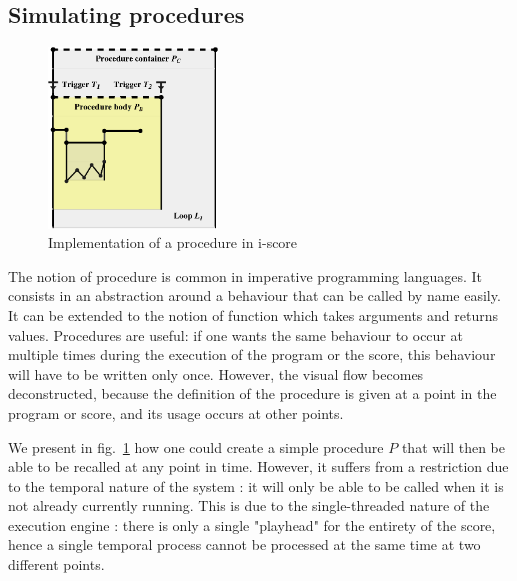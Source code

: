 \documentclass{article}
\begin{document}
\subsection{Simulating procedures}
\begin{figure}[h]
\centering
\includegraphics[width=0.40\textwidth]{images/function.eps}
\caption{Implementation of a procedure in i-score}
\label{fig.function}
\end{figure}

The notion of procedure is common in imperative programming languages.
It consists in an abstraction around a behaviour that can be called 
by name easily.
It can be extended to the notion of function which takes arguments 
and returns values.
Procedures are useful: if one wants the same behaviour to occur at multiple times during
the execution of the program or the score, this behaviour will 
have to be written only once.
However, the visual flow becomes deconstructed, because 
the definition of the procedure is given at a point in the program or score, 
and its usage occurs at other points.

We present in fig.~\ref{fig.function} how one could create a simple 
procedure $P$ that will then be able to be recalled at any point in time.
However, it suffers from a restriction due to the temporal nature of the system : 
it will only be able to be called when it is not already currently running. 
This is due to the single-threaded nature of the execution engine : there is 
only a single "playhead" for the entirety of the score, hence a single 
temporal process cannot be processed at the same time at two different points.
\end{document}
